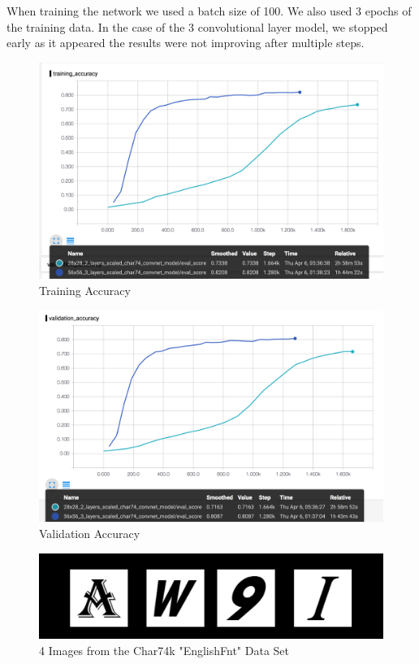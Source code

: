 \documentclass[11pt]{article}
\begin{document}
    When training the network we used a batch size of 100. We also used 3 epochs of the training data. In the case of the 3 convolutional layer model, we stopped early as it appeared the results were not improving after multiple steps.
    
    \begin{figure}
    \centering
    \includegraphics[scale=0.4]{training_accuracy.png}
    \caption{Training Accuracy}
    \label{fig:training_accuracy}
    \end{figure}

\begin{figure}
    \centering
    \includegraphics[scale=0.4]{validation_accuracy.png}
    \caption{Validation Accuracy}
    \label{fig:validation_accuracy}
\end{figure}
    
    \begin{figure}
        \centering
        \includegraphics[scale=0.4]{training_data_sample.png}
        \caption{4 Images from the Char74k "EnglishFnt" Data Set}
        \label{fig:char74k_data}
    \end{figure}
    
\end{document}
